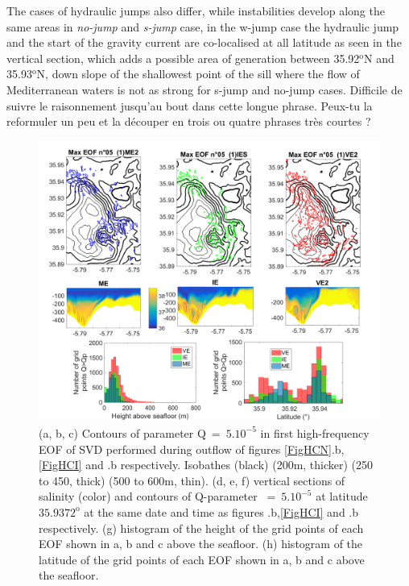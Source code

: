 The cases \color{blue}of hydraulic jumps \color{black} also differ, while instabilities develop along the same areas in \textit{no-jump} and \textit{s-jump} case, in the w-jump case the hydraulic jump and the start of the gravity current are co-localised at all latitude as seen in the vertical section, which adds a possible area of generation between 35.92$^\text{o}$N and 35.93$^\text{o}$N, down slope of the shallowest point of the sill where the flow of Mediterranean waters is not as strong for s-jump and no-jump cases. \color{green} Difficile de suivre le raisonnement jusqu'au bout dans cette longue phrase. Peux-tu la reformuler un peu et la découper en trois ou quatre phrases très courtes ? \color{black}


\begin{figure}[!h]
 \includegraphics[width=\textwidth]{./GBR3D/EOF5_MIV_2D.png}
 \caption {(a, b, c) Contours of parameter Q$\ =\ 5.10^{-5}$ in first high-frequency EOF of SVD performed during outflow of figures \ref{FigHCN}.b,\ref{FigHCI} and .b respectively. Isobathes (black) (200m, thicker)  (250 to 450, thick) (500 to 600m, thin). (d, e, f) vertical sections of salinity (color) and contours of Q-parameter $\ =\ 5.10^{-5}$ at latitude $35.9372^\text{o}$ at the same date and time as figures .b,\ref{FigHCI} and .b respectively. (g) histogram of the height of the grid points of each EOF shown in a, b and c above the seafloor. (h) histogram of the latitude of the grid points of each EOF shown in a, b and c above the seafloor.}
 \label{FigEOFMIV}
\end{figure}


